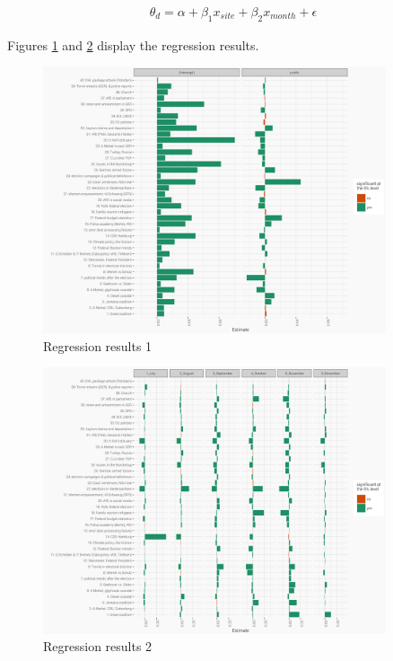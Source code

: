 \documentclass[12pt,a4paper,notitlepage]{article}
\begin{document}
\begin{align}\label{eq_1}
	\theta_d=\alpha+\beta_1x_{site}+\beta_2x_{month}+\epsilon
\end{align}

Figures \ref{fig_estimateEffects1} and \ref{fig_estimateEffects2} display the regression results.  

\begin{figure}[H]
	\caption{Regression results 1}
		\begin{center}
			\includegraphics[width=0.9\textwidth,keepaspectratio]{../figs/estimates_site.png}
		\end{center}
	\label{fig_estimateEffects1}
\end{figure}

\begin{figure}[H]
	\caption{Regression results 2}
		\begin{center}
			\includegraphics[width=0.9\textwidth,keepaspectratio]{../figs/estimates_month.png}
		\end{center}
	\label{fig_estimateEffects2}
\end{figure}
\end{document}
